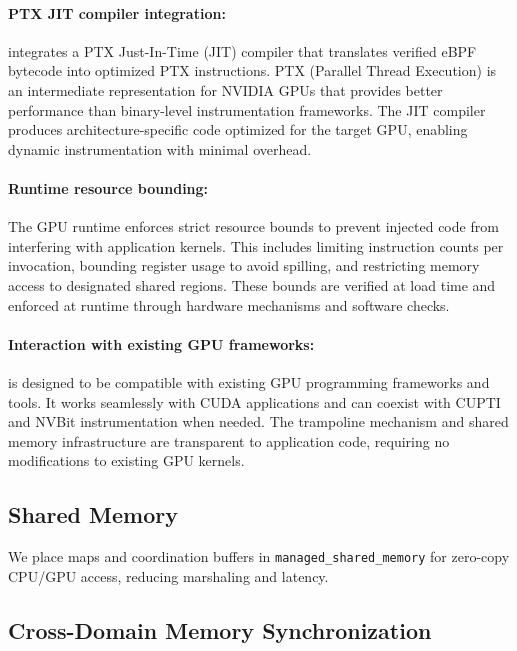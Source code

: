 \paragraph{PTX JIT compiler integration:}
\sys integrates a PTX Just-In-Time (JIT) compiler that translates verified eBPF bytecode into optimized PTX instructions. PTX (Parallel Thread Execution) is an intermediate representation for NVIDIA GPUs that provides better performance than binary-level instrumentation frameworks. The JIT compiler produces architecture-specific code optimized for the target GPU, enabling dynamic instrumentation with minimal overhead.

\paragraph{Runtime resource bounding:}
The GPU runtime enforces strict resource bounds to prevent injected code from interfering with application kernels. This includes limiting instruction counts per invocation, bounding register usage to avoid spilling, and restricting memory access to designated shared regions. These bounds are verified at load time and enforced at runtime through hardware mechanisms and software checks.

\paragraph{Interaction with existing GPU frameworks:}
\sys is designed to be compatible with existing GPU programming frameworks and tools. It works seamlessly with CUDA applications and can coexist with CUPTI and NVBit instrumentation when needed. The trampoline mechanism and shared memory infrastructure are transparent to application code, requiring no modifications to existing GPU kernels.

\subsection{Shared Memory}

We place maps and coordination buffers in \texttt{managed\_shared\_memory} for zero-copy CPU/GPU access, reducing marshaling and latency.


\subsection{Cross-Domain Memory Synchronization}

